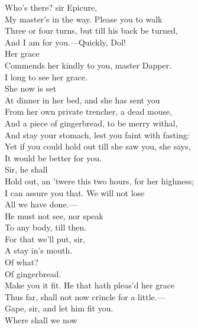 \documentclass[a4paper,oneside]{memoir}
\begin{document}
\begin{drama*}
\facespeaks {} Who's there? sir Epicure,\\
My master's in the way. Please you to walk\\
Three or four turns, but till his back be turned,\\
And I am for you.---Quickly, Dol!\\
\subtlespeaks {} Her grace\\
Commends her kindly to you, master Dapper.\\
\dapperspeaks I long to see her grace.\\
\subtlespeaks {} She now is set\\
At dinner in her bed, and she has sent you\\
From her own private trencher, a dead mouse,\\
And a piece of gingerbread, to be merry withal,\\
And stay your stomach, lest you faint with fasting:\\
Yet if you could hold out till she saw you, she says,\\
It would be better for you.\\
\facespeaks {} Sir, he shall\\
Hold out, an 'twere this two hours, for her highness;\\
I can assure you that. We will not lose\\
All we have done.---\\
\subtlespeaks {} He must not see, nor speak\\
To any body, till then.\\
\facespeaks {} For that we'll put, sir,\\
A stay in's mouth.\\
\subtlespeaks {} Of what?\\
\facespeaks {} Of gingerbread.\\
Make you it fit. He that hath pleas'd her grace\\
Thus far, shall not now crincle for a little.---\\
Gape, sir, and let him fit you.\\
\subtlespeaks {} Where shall we now\\

\end{drama*}
\end{document}
